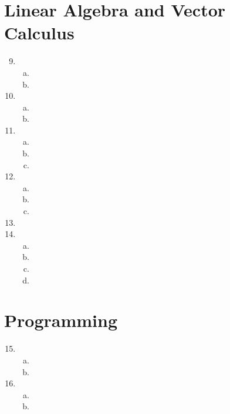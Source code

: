 \documentclass{article}
\begin{document}
\section*{Linear Algebra and Vector Calculus}
\begin{enumerate}[1.]
\setcounter{enumi}{8}
\item \begin{enumerate}[a.]
      \item
      \item
      \end{enumerate}
\item \begin{enumerate}[a.]
      \item
      \item
      \end{enumerate}
\item \begin{enumerate}[a.]
      \item
      \item
      \item
      \end{enumerate}
\item \begin{enumerate}[a.]
      \item
      \item
      \item
      \end{enumerate}
\item
\item \begin{enumerate}[a.]
      \item
      \item
      \item
      \item
      \end{enumerate}
\end{enumerate}
\section*{Programming}
\begin{enumerate}[1.]
\setcounter{enumi}{14}
\item \begin{enumerate}[a.]
      \item
      \item
      \end{enumerate}
\item \begin{enumerate}[a.]
      \item
      \item
      \end{enumerate}
\end{enumerate}
\end{document}

